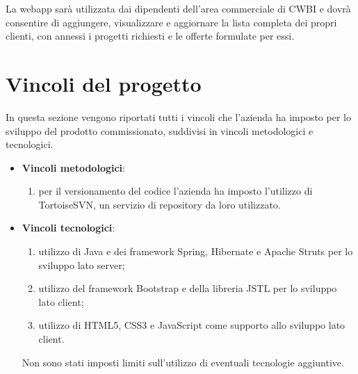 \noindent La webapp sarà utilizzata dai dipendenti dell'area commerciale di CWBI e dovrà consentire di aggiungere, visualizzare e aggiornare la lista completa dei propri clienti, con annessi i progetti richiesti e le offerte formulate per essi. 

\setlength{\parskip}{3ex}

\section{Vincoli del progetto}
In questa sezione vengono riportati tutti i vincoli che l'azienda ha imposto per lo sviluppo del prodotto commissionato, suddivisi in vincoli metodologici e tecnologici.

\begin{itemize}
\item \textbf{Vincoli metodologici}:
\begin{enumerate}
\item per il versionamento del codice l'azienda ha imposto l'utilizzo di TortoiseSVN, un servizio di repository da loro utilizzato. 
\end{enumerate}

\item \textbf{Vincoli tecnologici}:
\begin{enumerate}
\item utilizzo di Java e dei framework Spring, Hibernate e Apache Struts per lo sviluppo lato server;
\item utilizzo del framework Bootstrap e della libreria JSTL per lo sviluppo lato client;
\item utilizzo di HTML5, CSS3 e JavaScript come supporto allo sviluppo lato client.
\end{enumerate}

Non sono stati imposti limiti sull’utilizzo di eventuali tecnologie aggiuntive.
\end{itemize}

